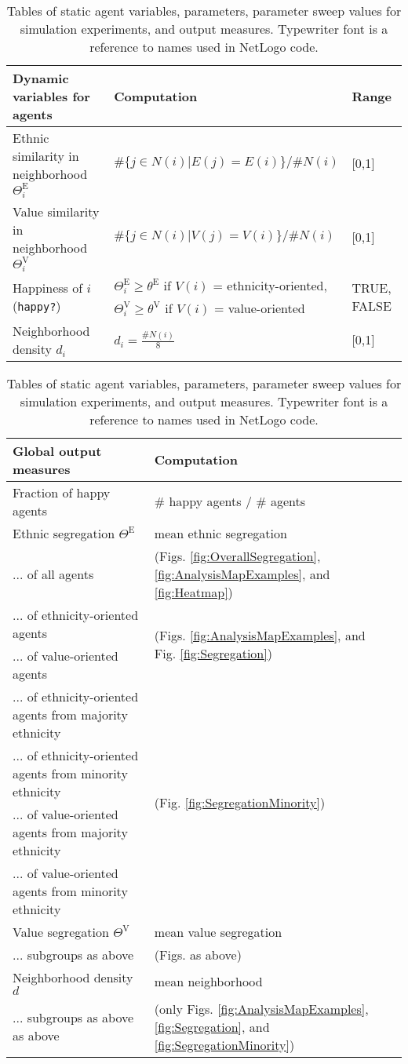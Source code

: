 \documentclass{ws-acs}
\begin{document}
{\begin{table}
\begin{tabular}{lll}
 Dynamic variables for agents                 & Computation & Range                \\ \midrule\midrule
 Ethnic similarity in neighborhood $\Theta^\text{E}_i$ & $\#\{j \in N(i) | E(j)=E(i)\} / \#N(i)$ & [0,1]  \\ 
 Value similarity in neighborhood $\Theta^\text{V}_i$ & $\#\{j \in N(i) | V(j)=V(i)\} / \#N(i)$ & [0,1]  \\ 
 \multirow{2}{*}{Happiness of $i$ (\texttt{happy?})} & $\Theta^\text{E}_i \geq \theta^\text{E}$ if $V(i)$ = ethnicity-oriented, & \multirow{2}{*}{TRUE, FALSE} \\
  & $\Theta^\text{V}_i \geq \theta^\text{V}$ if $V(i)$ = value-oriented &   \\
 Neighborhood density $d_i$           & $d_i = \frac{\#N(i)}{8}$ & [0,1]  \\
 \bottomrule
\end{tabular}

\bigskip

\begin{tabular}{lll}
 Global output measures    & Computation   \\ \midrule\midrule
 Fraction of happy agents & \# happy agents / \# agents \\
 Ethnic segregation $\Theta^\text{E}$       & mean ethnic segregation      \\ 
  ... of all agents          & (Figs. \ref{fig:OverallSegregation}, \ref{fig:AnalysisMapExamples},  and \ref{fig:Heatmap})  \\
  ... of ethnicity-oriented agents  & \multirow{2}{*}{(Figs. \ref{fig:AnalysisMapExamples},  and Fig. \ref{fig:Segregation})}  \\
  ... of value-oriented agents      &                                         \\
  ... of ethnicity-oriented agents from majority ethnicity  &  \multirow{4}{*}{(Fig. \ref{fig:SegregationMinority})} \\
  ... of ethnicity-oriented agents from minority ethnicity  &                       \\
  ... of value-oriented agents from majority ethnicity  &                       \\
  ... of value-oriented agents from minority ethnicity  &                       \\
  Value segregation $\Theta^\text{V}$        & mean value segregation    \\ 
  ... subgroups as above & (Figs. as above)\\
 Neighborhood density $d$                   & mean neighborhood      \\  
  ... subgroups as above as above & (only Figs. \ref{fig:AnalysisMapExamples}, \ref{fig:Segregation},  and \ref{fig:SegregationMinority})\\
 \bottomrule
\end{tabular}
\caption{Tables of static agent variables, parameters, parameter sweep values for simulation experiments, and output measures. Typewriter font is a reference to names used in NetLogo code. } \label{tab:parameters}
\end{table}

}
\end{document}
